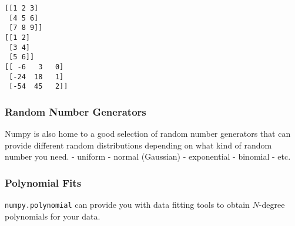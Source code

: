     \begin{Verbatim}[commandchars=\\\{\}]
[[1 2 3]
 [4 5 6]
 [7 8 9]]
[[1 2]
 [3 4]
 [5 6]]
[[ -6   3   0]
 [-24  18   1]
 [-54  45   2]]
    \end{Verbatim}

    \hypertarget{random-number-generators}{%
\subsubsection{Random Number
Generators}\label{random-number-generators}}

Numpy is also home to a good selection of random number generators that
can provide different random distributions depending on what kind of
random number you need. - uniform - normal (Gaussian) - exponential -
binomial - etc.

\hypertarget{polynomial-fits}{%
\subsubsection{Polynomial Fits}\label{polynomial-fits}}

\texttt{numpy.polynomial} can provide you with data fitting tools to
obtain \(N\)-degree polynomials for your data.
